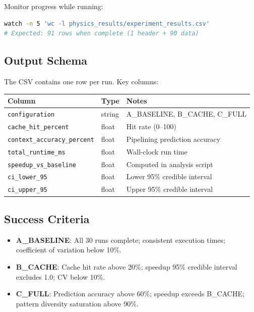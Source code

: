 Monitor progress while running:

\begin{lstlisting}[language=bash]
watch -n 5 'wc -l physics_results/experiment_results.csv'
# Expected: 91 rows when complete (1 header + 90 data)
\end{lstlisting}

\subsection{Output Schema}

The CSV contains one row per run. Key columns:

\begin{center}
\begin{tabular}{lll}
\toprule
Column & Type & Notes \\
\midrule
\texttt{configuration} & string & A\_BASELINE, B\_CACHE, C\_FULL \\
\texttt{cache\_hit\_percent} & float & Hit rate (0--100) \\
\texttt{context\_accuracy\_percent} & float & Pipelining prediction accuracy \\
\texttt{total\_runtime\_ms} & float & Wall-clock run time \\
\texttt{speedup\_vs\_baseline} & float & Computed in analysis script \\
\texttt{ci\_lower\_95} & float & Lower 95\% credible interval \\
\texttt{ci\_upper\_95} & float & Upper 95\% credible interval \\
\bottomrule
\end{tabular}
\end{center}

\subsection{Success Criteria}

\begin{itemize}
  \item \textbf{A\_BASELINE}: All 30 runs complete; consistent execution
        times; coefficient of variation below 10\%.
  \item \textbf{B\_CACHE}: Cache hit rate above 20\%; speedup 95\%
        credible interval excludes 1.0; CV below 10\%.
  \item \textbf{C\_FULL}: Prediction accuracy above 60\%; speedup exceeds
        B\_CACHE; pattern diversity saturation above 90\%.
\end{itemize}

